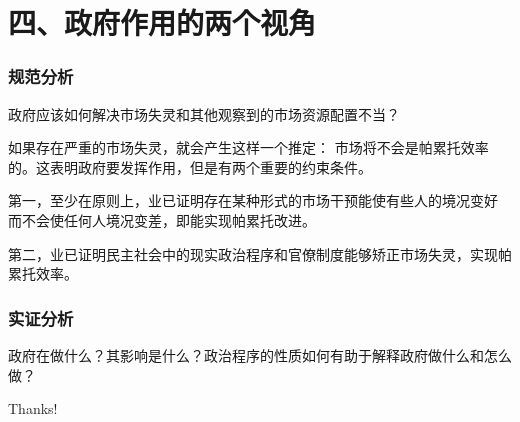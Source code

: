 \documentclass[aspectratio=169, 12pt]{beamer}
\begin{document}
\section{四、政府作用的两个视角}

\begin{frame}[plain]
    \frametitle{规范分析}
    政府应该如何解决市场失灵和其他观察到的市场资源配置不当？
    \par
    如果存在严重的市场失灵，就会产生这样一个推定：
    市场将不会是帕累托效率的。这表明政府要发挥作用，但是有两个重要的约束条件。
    \par
    第一，至少在原则上，业已证明存在某种形式的市场干预能使有些人的境况变好
    而不会使任何人境况变差，即能实现帕累托改进。
    \par
    第二，业已证明民主社会中的现实政治程序和官僚制度能够矫正市场失灵，实现帕累托效率。
\end{frame}

\begin{frame}[plain]
    \frametitle{实证分析}
    政府在做什么？其影响是什么？政治程序的性质如何有助于解释政府做什么和怎么做？
\end{frame}

\begin{frame}[standout]
    \begin{center}
        {\Huge\calligra Thanks!}
    \end{center}
\end{frame}
\end{document}
